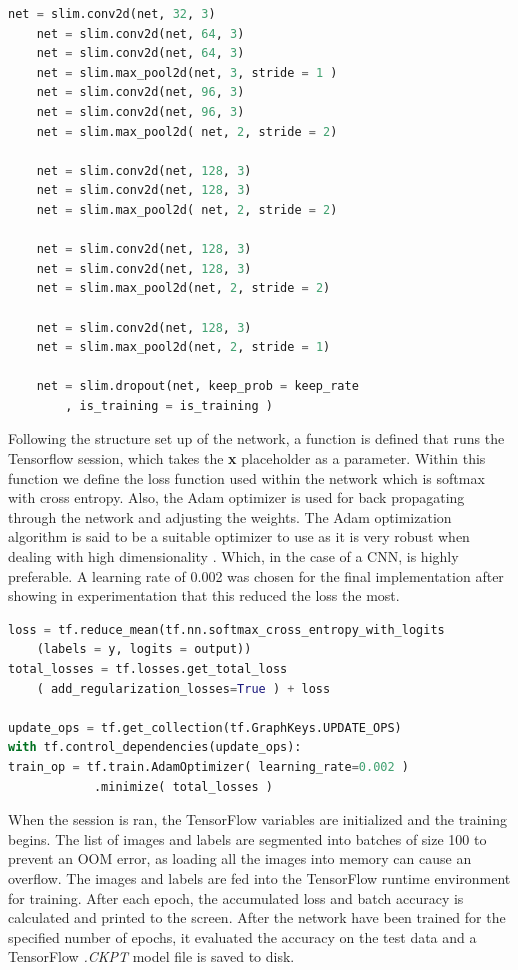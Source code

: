 \begin{lstlisting}[language=python, frame=single]
	net = slim.conv2d(net, 32, 3)
	net = slim.conv2d(net, 64, 3)
	net = slim.conv2d(net, 64, 3)
	net = slim.max_pool2d(net, 3, stride = 1 )
	net = slim.conv2d(net, 96, 3)
	net = slim.conv2d(net, 96, 3)
	net = slim.max_pool2d( net, 2, stride = 2)
	
	net = slim.conv2d(net, 128, 3)
	net = slim.conv2d(net, 128, 3)
	net = slim.max_pool2d( net, 2, stride = 2)
	
	net = slim.conv2d(net, 128, 3)
	net = slim.conv2d(net, 128, 3)
	net = slim.max_pool2d(net, 2, stride = 2)
	
	net = slim.conv2d(net, 128, 3)
	net = slim.max_pool2d(net, 2, stride = 1)
	
	net = slim.dropout(net, keep_prob = keep_rate
		, is_training = is_training )
\end{lstlisting}

Following the structure set up of the network, a function is defined that runs the Tensorflow session, which takes the \textbf{x} placeholder as a parameter.
Within this function we define the loss function used within the network which is softmax with cross entropy. Also, the Adam optimizer is used for back propagating through the network and adjusting the weights. The Adam optimization algorithm is said to be a suitable optimizer to use as it is very robust when dealing with high dimensionality \citep{DBLP}. Which, in the case of a CNN, is highly preferable. A learning rate of 0.002 was chosen for the final implementation after showing in experimentation that this reduced the loss the most. 

\begin{lstlisting}[language=python, frame=single]
loss = tf.reduce_mean(tf.nn.softmax_cross_entropy_with_logits
    (labels = y, logits = output))
total_losses = tf.losses.get_total_loss
	( add_regularization_losses=True ) + loss

update_ops = tf.get_collection(tf.GraphKeys.UPDATE_OPS)
with tf.control_dependencies(update_ops):
train_op = tf.train.AdamOptimizer( learning_rate=0.002 )
			.minimize( total_losses )
\end{lstlisting}


When the session is ran, the TensorFlow variables are initialized and the training begins. 
The list of images and labels are segmented into batches of size 100 to prevent an OOM error, as loading all the images into memory can cause an overflow. The images and labels are fed into the TensorFlow runtime environment for training. After each epoch, the accumulated loss and batch accuracy is calculated and printed to the screen.
After the network have been trained for the specified number of epochs, it evaluated the accuracy on the test data and a TensorFlow \textit{.CKPT} model file is saved to disk.

